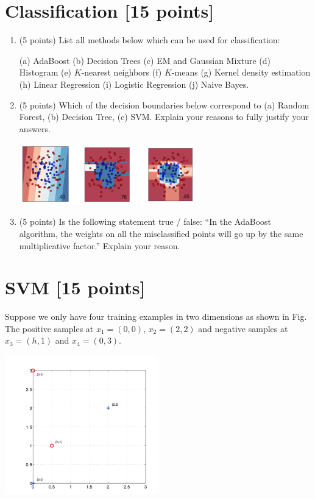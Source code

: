 \documentclass[a4paper,12pt,fleqn]{article}
\begin{document}
\clearpage
\section{Classification [15 points]}

\begin{enumerate}
\item (5 points) List all methods below which can be used for classification:

(a) AdaBoost (b) Decision Trees (c) EM and Gaussian Mixture (d) Histogram (e) $K$-nearest neighbors (f) $K$-means (g) Kernel density estimation 
(h) Linear Regression (i) Logistic Regression (j) Naive Bayes. 



\vspace{1.3in}

\item (5 points) Which of the decision boundaries below correspond to (a) Random Forest, (b) Decision Tree, (c) SVM. Explain your reasons  to fully justify your answers. 
%
\begin{center}
\includegraphics[width = 0.6\textwidth]{decision}
\end{center}

\vspace{1in}

\item (5 points) Is the following statement true / false: ``In the AdaBoost algorithm, the weights on all the
misclassified points will go up by the same multiplicative factor.'' Explain your reason.

\end{enumerate}


\clearpage
\section{SVM [15 points]}

Suppose we only have four training examples in two dimensions as shown in Fig. The positive samples at $x_1 = (0, 0)$, $x_2 = (2, 2)$ and negative samples at $x_3 = (h, 1)$ and $x_4 = (0, 3)$. 
%
\begin{center}
\includegraphics[width = 0.5\textwidth]{svm}
\end{center}
\end{document}
